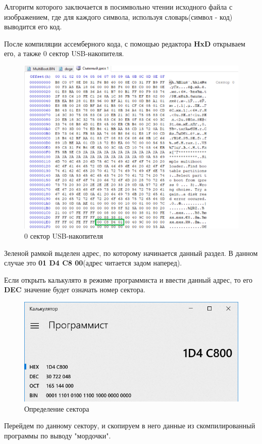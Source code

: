 Алгоритм которого заключается в посимвольно чтении исходного файла с изображением, где для каждого символа, используя словарь(символ - код) выводится его код.

После компиляции ассемберного кода, с помощью редактора \textbf{HxD} открываем его, а также 0 сектор USB-накопителя.
\begin{figure}[H]
  \centering
  \includegraphics[width=.9\textwidth]{img/p3/third}
  \caption{0 сектор USB-накопителя}
\end{figure}
Зеленой рамкой выделен адрес, по которому начинается данный раздел. В данном случае это \textbf{01 D4 C8 00}(адрес читается задом наперед).

Если открыть калькулято в режиме программиста и ввести данный адрес, то его \textbf{DEC} значение будет означать номер сектора.
\begin{figure}[H]
  \centering
  \includegraphics[width=.7\textwidth]{img/p3/calc}
  \caption{Определение сектора}
\end{figure}
Перейдем по данному сектору, и скопируем в него данные из скомпилированный программы по выводу "мордочки".

